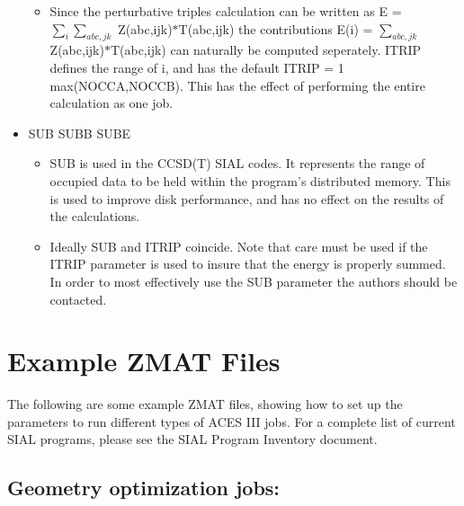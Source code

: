 \documentclass[12pt]{article}
\begin{document}
\begin{itemize}
\begin{itemize}
   \item Since the perturbative triples calculation can be written as
   E = $\sum_i \sum_{abc,jk}$ Z(abc,ijk)$*$T(abc,ijk)
   the contributions E(i) = $\sum_{abc,jk}$ Z(abc,ijk)$*$T(abc,ijk)
   can naturally be computed seperately. ITRIP defines the range of i,
   and has the default ITRIP = 1 max(NOCCA,NOCCB).  This has the effect of
   performing the entire calculation as one job.
   \end{itemize} 
\item SUB SUBB SUBE
   \begin{itemize} 
   \item SUB is used in the CCSD(T) SIAL codes.  It represents the range of
   occupied data to be held within the program's distributed memory.  This
   is used to improve disk performance, and has no effect on the results
   of the calculations.

   \item Ideally SUB and ITRIP coincide. Note that care must be used if the
   ITRIP parameter is used to insure that
   the energy is properly summed. In order to most effectively use
   the SUB parameter the authors should be contacted.
   \end{itemize} 
\end{itemize} 

\section{\Large \bf Example ZMAT Files}
\noindent  
The following are some example ZMAT files, showing how to set up the parameters to run 
different types of ACES III jobs. For a complete list of current SIAL programs, please 
see the SIAL Program Inventory document. 

\subsection{Geometry optimization jobs:} 
\end{document}
